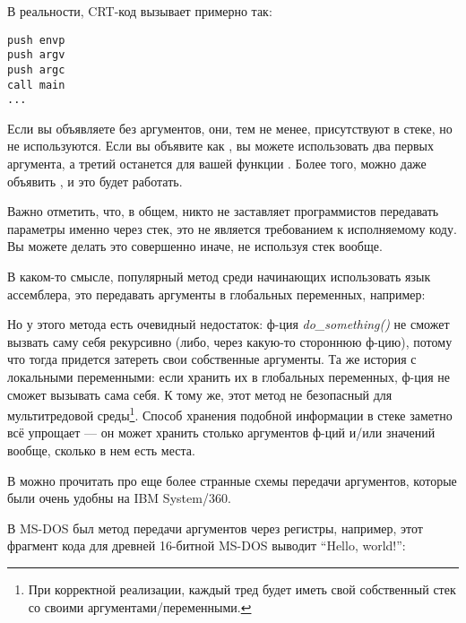 В реальности, \ac{CRT}-код вызывает \main примерно так:

\begin{lstlisting}[style=customasmx86]
push envp
push argv
push argc
call main
...
\end{lstlisting}

Если вы объявляете \main без аргументов, они, тем не менее, присутствуют в стеке, но не используются.
Если вы объявите \main как , 
вы можете использовать два первых аргумента, а третий останется для вашей функции .
Более того, можно даже объявить , и это будет работать.



Важно отметить, что, в общем, никто не заставляет программистов передавать параметры именно через стек, это не является требованием к исполняемому коду.
Вы можете делать это совершенно иначе, не используя стек вообще.

В каком-то смысле, популярный метод среди начинающих использовать язык ассемблера,
это передавать аргументы в глобальных переменных, например:



Но у этого метода есть очевидный недостаток: ф-ция \emph{do\_something()} не сможет вызвать саму себя рекурсивно (либо, через
какую-то стороннюю ф-цию),
потому что тогда придется затереть свои собственные аргументы.
Та же история с локальными переменными: если хранить их в глобальных переменных, ф-ция не сможет вызывать сама себя.
К тому же, этот метод не безопасный для мультитредовой среды\footnote{При корректной реализации,
каждый тред будет иметь свой собственный стек со своими аргументами/переменными.}.
Способ хранения подобной информации в стеке заметно всё упрощает ---
он может хранить столько аргументов ф-ций и/или значений вообще,
сколько в нем есть места.

В  можно прочитать про еще более странные схемы передачи аргументов,
которые были очень удобны на IBM System/360.


В MS-DOS был метод передачи аргументов через регистры, например, этот фрагмент кода для древней 16-битной MS-DOS
выводит ``Hello, world!'':

